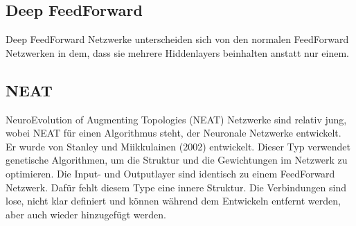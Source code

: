
\subsection{Deep FeedForward}
\label{subsec:DeepFeedForward}

Deep FeedForward Netzwerke unterscheiden sich von den normalen FeedForward Netzwerken in dem, dass sie mehrere Hiddenlayers beinhalten anstatt nur einem.

\subsection{NEAT}

NeuroEvolution of Augmenting Topologies (NEAT) Netzwerke sind relativ jung, wobei NEAT für einen Algorithmus steht, der Neuronale Netzwerke entwickelt.
Er wurde von Stanley und Miikkulainen (2002) entwickelt. 
Dieser Typ verwendet genetische Algorithmen, um die Struktur und die Gewichtungen im Netzwerk zu optimieren.
Die Input- und Outputlayer sind identisch zu einem FeedForward Netzwerk.
Dafür fehlt diesem Type eine innere Struktur. 
Die Verbindungen sind lose, nicht klar definiert und können während dem Entwickeln entfernt werden, aber auch wieder hinzugefügt werden.




